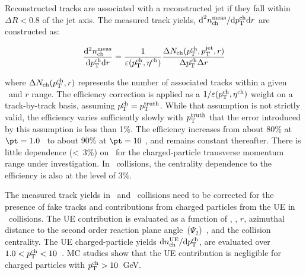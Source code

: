 
Reconstructed  tracks are associated with a reconstructed jet if they fall within $\Delta R < 0.8$ of the jet axis. The measured track yields, $ \text{d}^{2} n_{\text{ch}}^{\text{meas}} / \mathrm{d} \mbox{$p_{\mathrm{T}}^{\mathrm{ch}}$} \mathrm{d} r $ are constructed as:

\begin{eqnarray}
\dfrac{\mathrm{d}^{2} \mbox{$n_{\mathrm{ch}}^{\mathrm{meas}}$} }{ \mathrm{d} \mbox{$p_{\mathrm{T}}^{\mathrm{ch}}$} \mathrm{d} r} = \frac{1}{\varepsilon(\mbox{$p_{\mathrm{T}}^{\mathrm{ch}}$},\mbox{$\eta^{\mathrm{ch}}$})} \frac{\Delta \mbox{$N_{\mathrm{ch}}$}(\mbox{$p_{\mathrm{T}}^{\mathrm{ch}}$},\mbox{$p_{\mathrm{T}}^{\mathrm{jet}}$},r)}{\Delta\mbox{$p_{\mathrm{T}}^{\mathrm{ch}}$} \Delta r}
\end{eqnarray}

where $\Delta \mbox{$N_{\mathrm{ch}}$} (\mbox{$p_{\mathrm{T}}^{\mathrm{ch}}$},r)$ represents the number of associated tracks within a given \pttrk\ and $r$ range. The efficiency correction is applied as a $1/\varepsilon(\mbox{$p_{\mathrm{T}}^{\mathrm{ch}}$},\mbox{$\eta^{\mathrm{ch}}$})$ weight on a track-by-track basis, assuming $\mbox{$p_{\mathrm{T}}^{\mathrm{ch}}$} = \mbox{$p_{\mathrm{T}}^{\mathrm{truth}}$}$. While that assumption is not strictly valid, the efficiency varies sufficiently slowly with $\mbox{$p_{\mathrm{T}}^{\mathrm{truth}}$}$ that the error
introduced by this assumption is less than 1\%. The efficiency increases from about 80\% at \mbox{$ \pt = 1.0$ \GeV} to about 90\% at $ \pt = 10 $ \GeV, and remains constant thereafter. There is little dependence \mbox{(< 3\%)} on \ptjet\ for the charged-particle transverse momentum range under investigation. In \pbpb\ collisions, the centrality dependence to the efficiency is also at the level of 3\%.

The measured track yields in \pp\ and \PbPb\ collisions need to be corrected for the presence of fake tracks and contributions from charged particles from the UE in \pbpb\ collisions. The UE contribution is evaluated as a function of \pttrk, \ptjet, $r$, azimuthal distance to the second order reaction plane angle~($\Psi_{2}$)~\cite{ATLAS:2012at}, and the collision centrality. The UE charged-particle yields $\mathrm{d} \mbox{$n_{\mathrm{ch}}^{\mathrm{UE}}$}/ \mathrm{d} \mbox{$p_{\mathrm{T}}^{\mathrm{ch}}$}$, are evaluated over \mbox{$1.0 < \mbox{$p_{\mathrm{T}}^{\mathrm{ch}}$} < 10$~\GeV}. MC studies show that the UE contribution is negligible for charged particles with $\mbox{$p_{\mathrm{T}}^{\mathrm{ch}}$}>10$~GeV.

